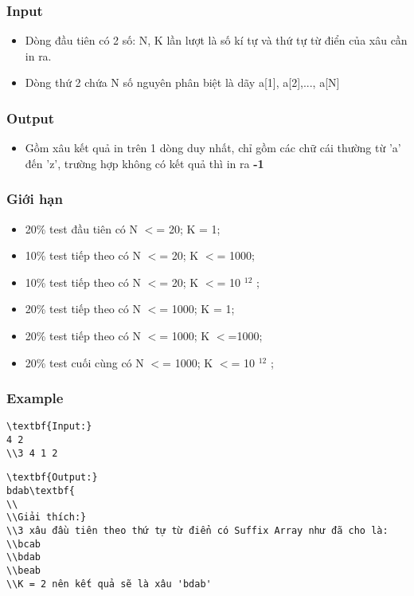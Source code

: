 \subsubsection{   Input  }
\begin{itemize}
	\item     Dòng đầu tiên có 2 số: N, K lần lượt là số kí tự và thứ tự từ điển của xâu cần in ra.   
	\item     Dòng thứ 2 chứa N số nguyên phân biệt là dãy a[1], a[2],..., a[N]   
\end{itemize}

\subsubsection{   Output  }
\begin{itemize}
	\item     Gồm xâu kết quả in trên 1 dòng duy nhất, chỉ gồm các chữ cái thường từ 'a' đến 'z', trường hợp không có kết quả thì in ra    \textbf{     -1    }
\end{itemize}

\subsubsection{   Giới hạn  }
\begin{itemize}
	\item     20\% test đầu tiên có N $<$= 20; K = 1;   
	\item     10\% test tiếp theo có N $<$= 20; K $<$= 1000;   
	\item     10\% test tiếp theo có N $<$= 20; K $<$= 10    $^     12    $    ;   
	\item     20\% test tiếp theo có N $<$= 1000; K = 1;   
	\item     20\% test tiếp theo có N $<$= 1000; K $<$=1000;   
	\item     20\% test cuối cùng có N $<$= 1000; K $<$= 10    $^     12    $    ;   
\end{itemize}

\subsubsection{   Example  }
\begin{verbatim}
\textbf{Input:}
4 2
\\3 4 1 2\end{verbatim}
\begin{verbatim}
\textbf{Output:}
bdab\textbf{
\\
\\Giải thích:}
\\3 xâu đầu tiên theo thứ tự từ điển có Suffix Array như đã cho là:
\\bcab
\\bdab
\\beab
\\K = 2 nên kết quả sẽ là xâu 'bdab' \end{verbatim}